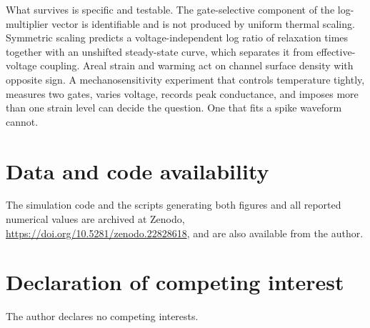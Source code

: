 What survives is specific and testable. The gate-selective component of the
log-multiplier vector is identifiable and is not produced by uniform thermal
scaling. Symmetric scaling predicts a voltage-independent log ratio of
relaxation times together with an unshifted steady-state curve, which separates
it from effective-voltage coupling. Areal strain and warming act on channel
surface density with opposite sign. A mechanosensitivity experiment that
controls temperature tightly, measures two gates, varies voltage, records peak
conductance, and imposes more than one strain level can decide the question. One
that fits a spike waveform cannot.

\section*{Data and code availability}

The simulation code and the scripts generating both figures and all reported
numerical values are archived at Zenodo,
\url{https://doi.org/10.5281/zenodo.22828618}, and are also available from the
author.

\section*{Declaration of competing interest}

The author declares no competing interests.


